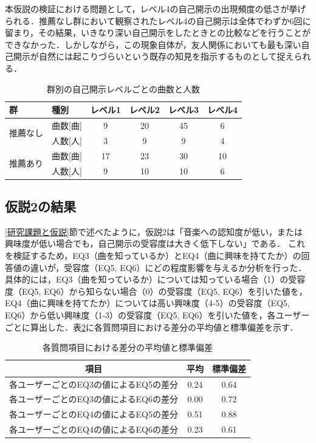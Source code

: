 本仮説の検証における問題として，レベル4の自己開示の出現頻度の低さが挙げられる．推薦なし群において観察されたレベル4の自己開示は全体でわずか6回に留まり，その結果，いきなり深い自己開示をしたときとの比較などを行うことができなかった．しかしながら，この現象自体が，友人関係においても最も深い自己開示が自然には起こりづらいという既存の知見を指示するものとして捉えられる．

\begin{table}[H]
  \centering
  \caption{群別の自己開示レベルごとの曲数と人数}
  \label{群別の自己開示レベルごとの曲数と人数}
  \begin{tabular}{llcccc}
    \hline
    群 & 種別 & レベル1 & レベル2 & レベル3 & レベル4 \\
    \hline
    \multirow{2}{*}{推薦なし} & 曲数[曲] & 9 & 20 & 45 & 6 \\
    & 人数[人] & 3 & 9 & 9 & 4 \\
    \hline
    \multirow{2}{*}{推薦あり} & 曲数[曲] & 17 & 23 & 30 & 10 \\
    & 人数[人] & 9 & 10 & 10 & 6 \\
    \hline
  \end{tabular}
  \label{table:群別の自己開示レベルごとの曲数と人数}
\end{table}



\subsection{仮説2の結果}\label{仮説2の結果}

\ref{研究課題と仮説}節で述べたように，仮説2は「音楽への認知度が低い，または興味度が低い場合でも，自己開示の受容度は大きく低下しない」である．
これを検証するため，EQ3（曲を知っているか）とEQ4（曲に興味を持てたか）の回答値の違いが，受容度（EQ5, EQ6）にどの程度影響を与えるか分析を行った．具体的には，EQ3（曲を知っているか）については知っている場合（1）の受容度（EQ5, EQ6）から知らない場合（0）の受容度（EQ5, EQ6）を引いた値を，EQ4（曲に興味を持てたか）については高い興味度（4-5）の受容度（EQ5, EQ6）から低い興味度（1-3）の受容度（EQ5, EQ6）を引いた値を，各ユーザーごとに算出した．表\ref{tab:differences}に各質問項目における差分の平均値と標準偏差を示す．

\begin{table}[H]
  \centering
  \caption{各質問項目における差分の平均値と標準偏差}
  \label{tab:differences}
  \begin{tabular}{ccc}
    \hline
    項目 & 平均 & 標準偏差 \\
    \hline
    各ユーザーごとのEQ3の値によるEQ5の差分 & 0.24 & 0.64 \\
    各ユーザーごとのEQ3の値によるEQ6の差分 & 0.00 & 0.72 \\
    各ユーザーごとのEQ4の値によるEQ5の差分 & 0.51 & 0.88 \\
    各ユーザーごとのEQ4の値によるEQ6の差分 & 0.23 & 0.61 \\
    \hline
  \end{tabular}
\end{table}

